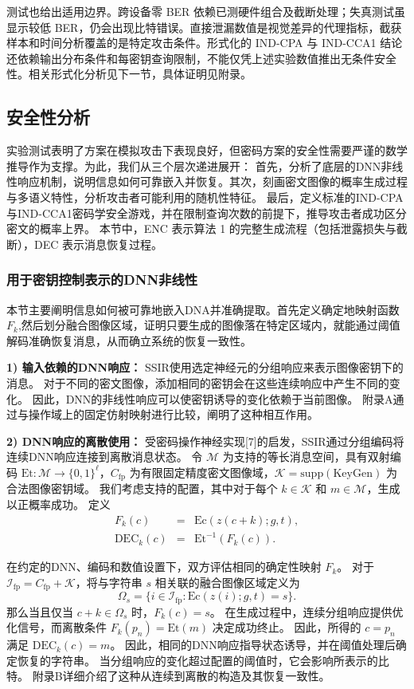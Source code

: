 测试也给出适用边界。跨设备零 BER 依赖已测硬件组合及截断处理；失真测试虽显示较低 BER，仍会出现比特错误。直接泄漏数值是视觉差异的代理指标，截获样本和时间分析覆盖的是特定攻击条件。形式化的 IND-CPA 与 IND-CCA1 结论还依赖输出分布条件和每密钥查询限制，不能仅凭上述实验数值推出无条件安全性。相关形式化分析见下一节，具体证明见附录。
\subsection{安全性分析}
实验测试表明了方案在模拟攻击下表现良好，但密码方案的安全性需要严谨的数学推导作为支撑。为此，我们从三个层次递进展开：
首先，分析了底层的DNN非线性响应机制，说明信息如何可靠嵌入并恢复。其次，刻画密文图像的概率生成过程与多语义特性，分析攻击者可能利用的随机性特征。
最后，定义标准的IND-CPA与IND-CCA1密码学安全游戏，并在限制查询次数的前提下，推导攻击者成功区分密文的概率上界。
本节中，ENC 表示算法 1 的完整生成流程（包括泄露损失与截断），DEC 表示消息恢复过程。
\subsubsection{用于密钥控制表示的DNN非线性}
本节主要阐明信息如何被可靠地嵌入DNA并准确提取。首先定义确定地映射函数$F_k$,然后划分融合图像区域，证明只要生成的图像落在特定区域内，就能通过阈值解码准确恢复消息，从而确立系统的恢复一致性。

\textbf{1) 输入依赖的DNN响应：}
SSIR使用选定神经元的分组响应来表示图像密钥下的消息。
对于不同的密文图像，添加相同的密钥会在这些连续响应中产生不同的变化。
因此，DNN的非线性响应可以使密钥诱导的变化依赖于当前图像。
附录A通过与操作域上的固定仿射映射进行比较，阐明了这种相互作用。

\textbf{2) DNN响应的离散使用：}
受密码操作神经实现[7]的启发，SSIR通过分组编码将连续DNN响应连接到离散消息状态。
令 \(\mathcal{M}\) 为支持的等长消息空间，具有双射编码 \(\mathrm{Et} : \mathcal{M} \to \{0,1\}^\ell\)，\(C_{\mathrm{fp}}\) 为有限固定精度密文图像域，\(\mathcal{K} = \mathrm{supp}(\mathrm{KeyGen})\) 为合法图像密钥域。
我们考虑支持的配置，其中对于每个 \(k \in \mathcal{K}\) 和 \(m \in \mathcal{M}\)，生成以正概率成功。
定义
\begin{equation}
\begin{array}{rcl}
F_k(c) &=& \mathrm{Ec}(z(c+k); g, t), \\
\mathrm{DEC}_k(c) &=& \mathrm{Et}^{-1}(F_k(c)).
\end{array}
\end{equation}

在约定的DNN、编码和数值设置下，双方评估相同的确定性映射 \(F_k\)。
对于 \(\mathcal{I}_{\mathrm{fp}} = C_{\mathrm{fp}} + \mathcal{K}\)，将与字符串 \(s\) 相关联的融合图像区域定义为
\begin{equation}
\Omega_s = \{ i \in \mathcal{I}_{\mathrm{fp}} : \mathrm{Ec}(z(i); g, t) = s \}.
\end{equation}
那么当且仅当 \(c + k \in \Omega_s\) 时，\(F_k(c) = s\)。
在生成过程中，连续分组响应提供优化信号，而离散条件 \(F_k(p_n) = \mathrm{Et}(m)\) 决定成功终止。
因此，所得的 \(c = p_n\) 满足 \(\mathrm{DEC}_k(c) = m\)。
因此，相同的DNN响应指导状态诱导，并在阈值处理后确定恢复的字符串。
当分组响应的变化超过配置的阈值时，它会影响所表示的比特。
附录B详细介绍了这种从连续到离散的构造及其恢复一致性。

